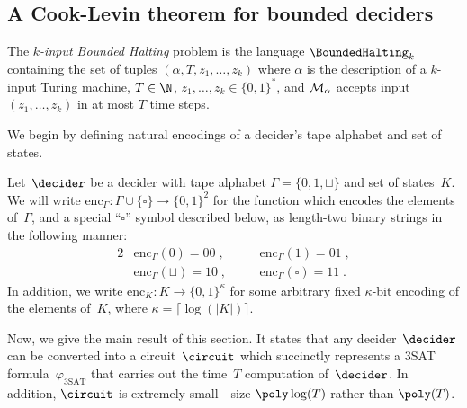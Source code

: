 \subsection{A Cook-Levin theorem for bounded deciders}
\label{sec:cook-levin}





\begin{definition}
	The \emph{$k$-input Bounded Halting} problem is the language
  $\BoundedHalting_k$ containing the set of tuples $(\alpha, T, z_1,\ldots,z_k)$
  where $\alpha$ is the description of a $k$-input Turing machine, $T \in \N$,
  $z_1, \ldots, z_k \in \{0,1\}^*$, and $\cal{M}_\alpha$ accepts input $(z_1,
  \ldots, z_k)$ in at most $T$ time steps.
\end{definition}

We begin by defining natural encodings of a decider's tape alphabet and set of
states.

\begin{definition}
  Let~$\decider$ be a decider with tape alphabet $\Gamma = \{0, 1, \sqcup\}$ and
  set of states~$K$.
  We will write $\mathrm{enc}_{\Gamma}: \Gamma \cup \{\square\} \rightarrow \{0,
  1\}^2$ for the function which encodes the elements of~$\Gamma$, and a special
  ``$\square$'' symbol described below, as length-two binary strings in the
  following manner:
  \begin{alignat*}{2}
    & \mathrm{enc}_{\Gamma}(0) = 00\;,\quad
    && \mathrm{enc}_{\Gamma}(1) = 01\;,\\
    & \mathrm{enc}_{\Gamma}(\sqcup) = 10\;,\quad
    && \mathrm{enc}_{\Gamma}(\square) = 11\;.
  \end{alignat*}
  In addition, we write $\mathrm{enc}_K : K \rightarrow \{0, 1\}^\kappa$ for
  some arbitrary fixed $\kappa$-bit encoding of the elements of~$K$, where
  $\kappa = \lceil \log(|K|) \rceil$.
\end{definition}

Now, we give the main result of this section.
It states that any decider~$\decider$ can be converted into a circuit~$\circuit$
which succinctly represents a 3SAT formula~$\varphi_{\mathrm{3SAT}}$ that
carries out the time~$T$ computation of~$\decider$.
In addition, $\circuit$ is extremely small---size $\poly \log(T)$ rather than
$\poly(T)$.

